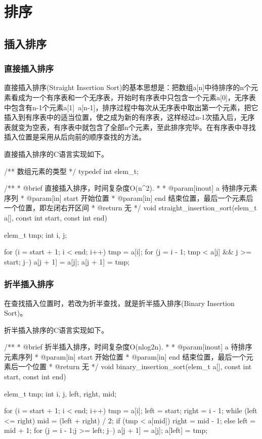 \chapter{排序}

\section{插入排序} %


\subsection{直接插入排序}
直接插入排序(Straight Insertion Sort)的基本思想是：把数组a[n]中待排序的n个元素看成为一个有序表和一个无序表，开始时有序表中只包含一个元素a[0]，无序表中包含有n-1个元素a[1]~a[n-1]，排序过程中每次从无序表中取出第一个元素，把它插入到有序表中的适当位置，使之成为新的有序表，这样经过n-1次插入后，无序表就变为空表，有序表中就包含了全部n个元素，至此排序完毕。在有序表中寻找插入位置是采用从后向前的顺序查找的方法。

直接插入排序的C语言实现如下。
\begin{Codex}[label=straight_insertion_sort.c]
/** 数组元素的类型 */
typedef int elem_t;

/**
  * @brief 直接插入排序，时间复杂度O(n^2).
  *
  * @param[inout] a 待排序元素序列
  * @param[in] start 开始位置
  * @param[in] end 结束位置，最后一个元素后一个位置，即左闭右开区间
  * @return 无
  */
void straight_insertion_sort(elem_t a[], const int start, const int end) {
    elem_t tmp;
    int i, j;

    for (i = start + 1; i < end; i++) {
        tmp = a[i];
        for (j = i - 1; tmp < a[j] && j >= start; j--) {
            a[j + 1] = a[j];
        }
        a[j + 1] = tmp;
    }
}
\end{Codex}


\subsection{折半插入排序}
在查找插入位置时，若改为折半查找，就是折半插入排序(Binary Insertion Sort)。

折半插入排序的C语言实现如下。
\begin{Codex}[label=binary_insertion_sort.c]
/**
  * @brief 折半插入排序，时间复杂度O(nlog2n).
  *
  * @param[inout] a 待排序元素序列
  * @param[in] start 开始位置
  * @param[in] end 结束位置，最后一个元素后一个位置
  * @return 无
  */
void binary_insertion_sort(elem_t a[], const int start, const int end) {
    elem_t tmp;
    int i, j, left, right, mid;

    for (i = start + 1; i < end; i++) {
        tmp = a[i];
        left = start;
        right = i - 1;
        while (left <= right) {
            mid = (left + right) / 2;
            if (tmp < a[mid]) {
                right = mid - 1;
            } else {
                left = mid + 1;
            }
        }
        for (j = i - 1;j >= left; j--) {
            a[j + 1] = a[j];
        }
        a[left] = tmp;
    }
}
\end{Codex}


